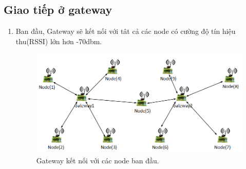 \subsection{Giao tiếp ở gateway}
\begin{enumerate}
    \item Ban đầu, Gateway sẽ kết nối với tât cả các node có cường độ tín hiệu thu(RSSI) lớn hơn -70dbm.
\begin{center}
    \begin{figure}[htp]
    \begin{center}
     \includegraphics[scale=0.45]{image2/bandau.png}
    \end{center}
    \caption{Gateway kết nối với các node ban đầu.}
    \label{refhinh1}
    \end{figure}
\end{center}
    

\end{enumerate}

